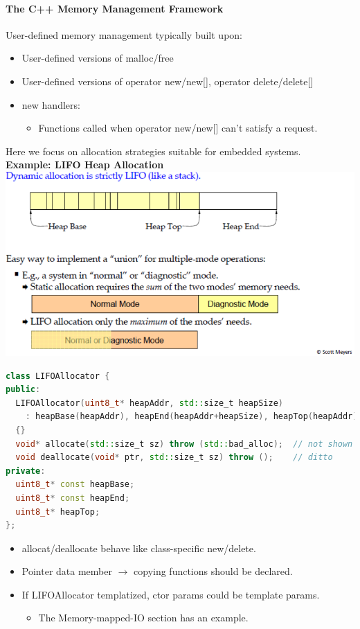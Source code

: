 \paragraph{The C++ Memory Management Framework}
User-defined memory management typically built upon:
\begin{itemize}
  \item User-defined versions of malloc/free
  \item User-defined versions of operator new/new[], operator delete/delete[]
  \item new handlers:
  \begin{itemize}
    \item Functions called when operator new/new[] can't satisfy a request.
  \end{itemize}
\end{itemize}
Here we focus on allocation strategies suitable for embedded systems.\\

\textbf{Example: LIFO Heap Allocation}\\
\includegraphics[width=0.7\linewidth]{images/AdvancedCPP/lifo}

\begin{lstlisting}[language=C++]
class LIFOAllocator {
public:
  LIFOAllocator(uint8_t* heapAddr, std::size_t heapSize)
    : heapBase(heapAddr), heapEnd(heapAddr+heapSize), heapTop(heapAddr)
  {}
  void* allocate(std::size_t sz) throw (std::bad_alloc);  // not shown
  void deallocate(void* ptr, std::size_t sz) throw ();    // ditto
private:
  uint8_t* const heapBase;
  uint8_t* const heapEnd;
  uint8_t* heapTop;
};
\end{lstlisting}
\begin{itemize}
  \item allocat/deallocate behave like class-specific new/delete.
  \item Pointer data member $\rightarrow$ copying functions should be declared.
  \item If LIFOAllocator templatized, ctor params could be template params.
  \begin{itemize}
    \item The Memory-mapped-IO section has an example.
  \end{itemize}
\end{itemize}

